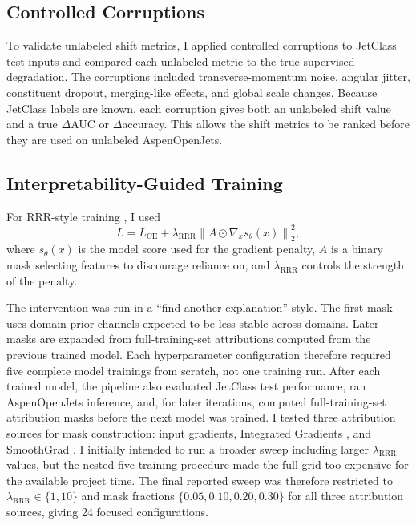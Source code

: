 \documentclass[11pt]{article}
\begin{document}
\subsection{Controlled Corruptions}

To validate unlabeled shift metrics, I applied controlled corruptions to JetClass test inputs and compared each unlabeled metric to the true supervised degradation. The corruptions included transverse-momentum noise, angular jitter, constituent dropout, merging-like effects, and global scale changes. Because JetClass labels are known, each corruption gives both an unlabeled shift value and a true $\Delta$AUC or $\Delta$accuracy. This allows the shift metrics to be ranked before they are used on unlabeled AspenOpenJets.

\subsection{Interpretability-Guided Training}

For RRR-style training \cite{ross2017right}, I used
\begin{equation}
L = L_{\mathrm{CE}} + \lambda_{\mathrm{RRR}}\left\|A\odot\nabla_x s_\theta(x)\right\|_2^2,
\end{equation}
where $s_\theta(x)$ is the model score used for the gradient penalty, $A$ is a binary mask selecting features to discourage reliance on, and $\lambda_{\mathrm{RRR}}$ controls the strength of the penalty.

The intervention was run in a ``find another explanation'' style. The first mask uses domain-prior channels expected to be less stable across domains. Later masks are expanded from full-training-set attributions computed from the previous trained model. Each hyperparameter configuration therefore required five complete model trainings from scratch, not one training run. After each trained model, the pipeline also evaluated JetClass test performance, ran AspenOpenJets inference, and, for later iterations, computed full-training-set attribution masks before the next model was trained. I tested three attribution sources for mask construction: input gradients, Integrated Gradients \cite{sundararajan2017axiomatic}, and SmoothGrad \cite{smilkov2017smoothgrad}. I initially intended to run a broader sweep including larger $\lambda_{\mathrm{RRR}}$ values, but the nested five-training procedure made the full grid too expensive for the available project time. The final reported sweep was therefore restricted to $\lambda_{\mathrm{RRR}}\in\{1,10\}$ and mask fractions $\{0.05,0.10,0.20,0.30\}$ for all three attribution sources, giving 24 focused configurations.
\end{document}
